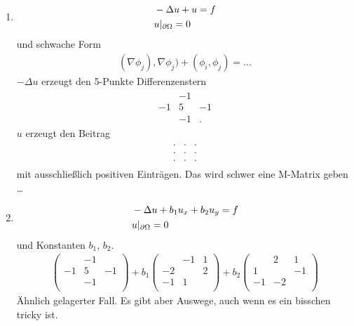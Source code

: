 \begin{beispiel} 
\renewcommand{\labelenumi}{(\alph{enumi})}
\begin{enumerate}
   Betrachte Friedrichs-Keller-Triangulation und Finite Elemente 
\item 
  \begin{align*}
&    - \Delta u + u = f\\
&    u|_{\partial \Omega} = 0
  \end{align*}
und schwache Form
\begin{align*}
  (\nabla \phi_j), \nabla \phi_j) + (\phi_i, \phi_j) = \dots
\end{align*}
$- \Delta u$ erzeugt den 5-Punkte Differenzenstern
\begin{align*}
  \begin{matrix}
    & -1 & \\
-1 & 5 & -1\\
    & -1 & .
  \end{matrix}
\end{align*}
$ u$ erzeugt den Beitrag
\begin{align*}
  \begin{matrix}
    \cdot & \cdot &\cdot  \\
\cdot  & \cdot  & \cdot \\
    \cdot & \cdot  & \cdot 
  \end{matrix}
\end{align*}
mit ausschließlich positiven Einträgen. Das wird schwer eine M-Matrix geben \dots
\item
\begin{align*}
&    - \Delta u + b_1u_x + b_2u_y = f\\
&    u|_{\partial \Omega} = 0  
\end{align*}
und Konstanten $b_1$, $b_2$.
\begin{align*}
  \begin{pmatrix}
    & -1 & \\
-1 & 5 &-1\\
    & -1 & \\
  \end{pmatrix} + b_1 
  \begin{pmatrix}
    & -1 &1 \\
-2 &  &2\\
  -1  & 1& \\
  \end{pmatrix} + b_2
  \begin{pmatrix}
    & 2 & 1\\
1 &  &-1\\
   -1 & -2 & \\
  \end{pmatrix}
\end{align*}
Ähnlich gelagerter Fall. Es gibt aber Auswege, auch wenn es ein bisschen tricky ist. 
\end{enumerate}
\end{beispiel}

